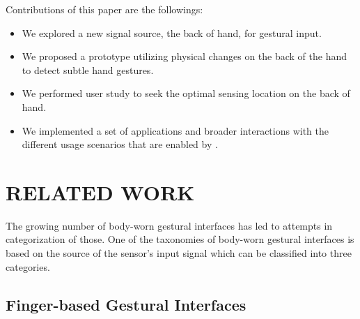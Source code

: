\documentclass{sigchi}
\begin{document}
Contributions of this paper are the followings:
\begin{itemize}
\item We explored a new signal source, the back of hand, for gestural input.
\item We proposed a prototype utilizing physical changes on the back of the hand to detect subtle hand gestures. 
\item We performed user study to seek the optimal sensing location on the back of hand.
\item We implemented a set of applications and broader interactions with the different usage scenarios that are enabled by \getTitleName.
\end{itemize}

\section{RELATED WORK}

The growing number of body-worn gestural interfaces has led to attempts in categorization of those.
One of the taxonomies of body-worn gestural interfaces is based on the source of the sensor's input signal which can be classified into three categories.

\subsection{Finger-based Gestural Interfaces}

\end{document}
